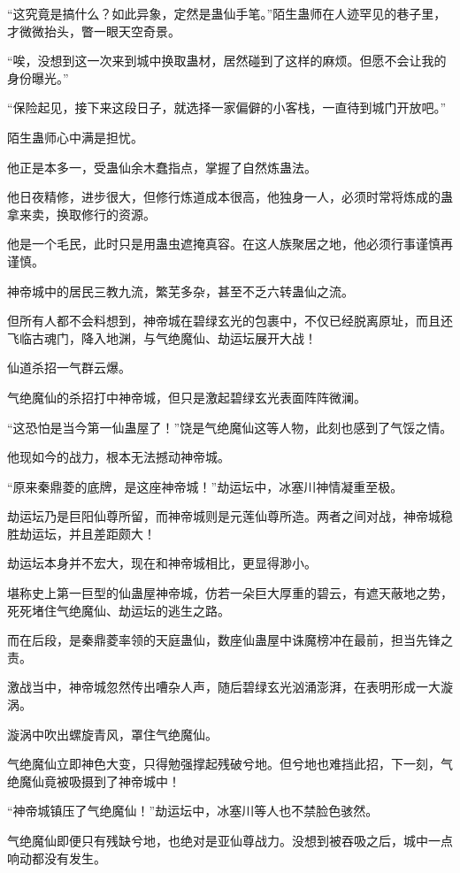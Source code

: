 \begin{this_body}
“这究竟是搞什么？如此异象，定然是蛊仙手笔。”陌生蛊师在人迹罕见的巷子里，才微微抬头，瞥一眼天空奇景。

“唉，没想到这一次来到城中换取蛊材，居然碰到了这样的麻烦。但愿不会让我的身份曝光。”

“保险起见，接下来这段日子，就选择一家偏僻的小客栈，一直待到城门开放吧。”

陌生蛊师心中满是担忧。

他正是本多一，受蛊仙余木蠢指点，掌握了自然炼蛊法。

他日夜精修，进步很大，但修行炼道成本很高，他独身一人，必须时常将炼成的蛊拿来卖，换取修行的资源。

他是一个毛民，此时只是用蛊虫遮掩真容。在这人族聚居之地，他必须行事谨慎再谨慎。

神帝城中的居民三教九流，繁芜多杂，甚至不乏六转蛊仙之流。

但所有人都不会料想到，神帝城在碧绿玄光的包裹中，不仅已经脱离原址，而且还飞临古魂门，降入地渊，与气绝魔仙、劫运坛展开大战！

仙道杀招一气群云爆。

气绝魔仙的杀招打中神帝城，但只是激起碧绿玄光表面阵阵微澜。

“这恐怕是当今第一仙蛊屋了！”饶是气绝魔仙这等人物，此刻也感到了气馁之情。

他现如今的战力，根本无法撼动神帝城。

“原来秦鼎菱的底牌，是这座神帝城！”劫运坛中，冰塞川神情凝重至极。

劫运坛乃是巨阳仙尊所留，而神帝城则是元莲仙尊所造。两者之间对战，神帝城稳胜劫运坛，并且差距颇大！

劫运坛本身并不宏大，现在和神帝城相比，更显得渺小。

堪称史上第一巨型的仙蛊屋神帝城，仿若一朵巨大厚重的碧云，有遮天蔽地之势，死死堵住气绝魔仙、劫运坛的逃生之路。

而在后段，是秦鼎菱率领的天庭蛊仙，数座仙蛊屋中诛魔榜冲在最前，担当先锋之责。

激战当中，神帝城忽然传出嘈杂人声，随后碧绿玄光汹涌澎湃，在表明形成一大漩涡。

漩涡中吹出螺旋青风，罩住气绝魔仙。

气绝魔仙立即神色大变，只得勉强撑起残破兮地。但兮地也难挡此招，下一刻，气绝魔仙竟被吸摄到了神帝城中！

“神帝城镇压了气绝魔仙！”劫运坛中，冰塞川等人也不禁脸色骇然。

气绝魔仙即便只有残缺兮地，也绝对是亚仙尊战力。没想到被吞吸之后，城中一点响动都没有发生。


\end{this_body}
